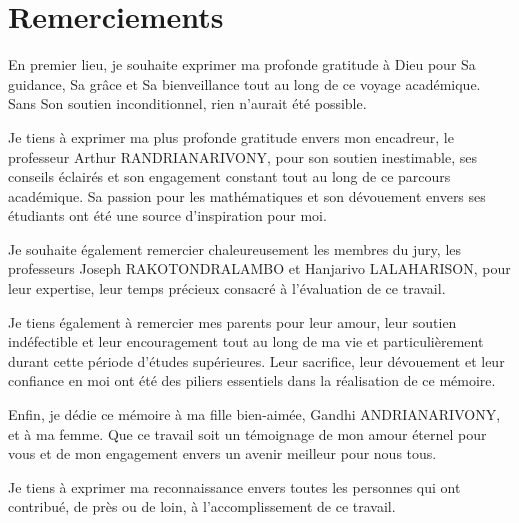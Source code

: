 \chapter*{Remerciements}
\label{chap:remerciements}

En premier lieu, je souhaite exprimer ma profonde gratitude à Dieu pour Sa guidance, Sa grâce et Sa bienveillance tout au long de ce voyage académique. Sans Son soutien inconditionnel, rien n'aurait été possible. \vspace{7pt}

Je tiens à exprimer ma plus profonde gratitude envers mon encadreur, le professeur Arthur RANDRIANARIVONY, pour son soutien inestimable, ses conseils éclairés et son engagement constant tout au long de ce parcours académique. Sa passion pour les mathématiques et son dévouement envers ses étudiants ont été une source d'inspiration pour moi. \vspace{7pt}

Je souhaite également remercier chaleureusement les membres du jury, les professeurs Joseph RAKOTONDRALAMBO et Hanjarivo LALAHARISON, pour leur expertise, leur temps précieux consacré à l'évaluation de ce travail. \vspace{7pt}

Je tiens également à remercier mes parents pour leur amour, leur soutien indéfectible et leur encouragement tout au long de ma vie et particulièrement durant cette période d'études supérieures. Leur sacrifice, leur dévouement et leur confiance en moi ont été des piliers essentiels dans la réalisation de ce mémoire. \vspace{7pt}

Enfin, je dédie ce mémoire à ma fille bien-aimée, Gandhi ANDRIANARIVONY, et à ma femme. Que ce travail soit un témoignage de mon amour éternel pour vous et de mon engagement envers un avenir meilleur pour nous tous. \vspace{7pt}

Je tiens à exprimer ma reconnaissance envers toutes les personnes qui ont contribué, de près ou de loin, à l'accomplissement de ce travail.